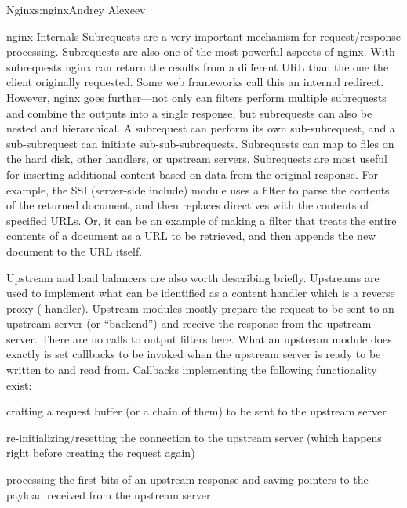 \begin{aosachapter}{Nginx}{s:nginx}{Andrey Alexeev}
\begin{aosasect1}{nginx Internals}
Subrequests are a very important mechanism for request/response
processing. Subrequests are also one of the most powerful aspects of
nginx. With subrequests nginx can return the results from a different
URL than the one the client originally requested. Some web frameworks
call this an internal redirect. However, nginx goes further---not only
can filters perform multiple subrequests and combine the outputs into
a single response, but subrequests can also be nested and
hierarchical. A subrequest can perform its own sub-subrequest, and a
sub-subrequest can initiate sub-sub-subrequests. Subrequests can map
to files on the hard disk, other handlers, or upstream
servers. Subrequests are most useful for inserting additional content
based on data from the original response. For example, the SSI
(server-side include) module uses a filter to parse the contents of
the returned document, and then replaces  directives
with the contents of specified URLs. Or, it can be an example of making
a filter that treats the entire contents of a document as a URL to be
retrieved, and then appends the new document to the URL itself.


Upstream and load balancers are also worth describing
briefly. Upstreams are used to implement what can be identified as a
content handler which is a reverse proxy (
handler). %
Upstream modules mostly prepare the request to be sent to an upstream
server (or ``backend'') and receive the response from the upstream
server. There are no calls to output filters here. What an upstream
module does exactly is set callbacks to be invoked when the upstream
server is ready to be written to and read from. Callbacks implementing
the following functionality exist:

\begin{aosaitemize}

\item crafting a request buffer (or a chain of them) to be sent to the
  upstream server

\item re-initializing/resetting the connection to the upstream server
  (which happens right before creating the request again)

\item processing the first bits of an upstream response and saving
  pointers to the payload received from the upstream server


\end{aosaitemize}
\end{aosasect1}
\end{aosachapter}
